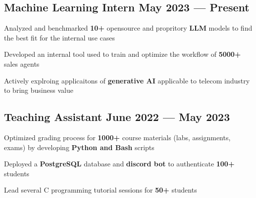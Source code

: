 
\subsection{{Machine Learning Intern \hfill May 2023 --- Present}}
\begin{zitemize}
    \item Analyzed and benchmarked \textbf{10+} opensource and propritory \textbf{LLM} models to find the best fit for the internal use cases
    \item Developed an internal tool used to train and optimize the workflow of \textbf{5000+} sales agents
    \item Actively explroing applicaitons of \textbf{generative AI} applicable to telecom industry to bring business value
\end{zitemize}


\vspace{0.3cm}\subsection{{Teaching Assistant \hfill June 2022 --- May 2023}}
\begin{zitemize}
    \item Optimized grading process for \textbf{1000+} course materials (labs, assignments, exams) by developing \textbf{Python and Bash} scripts
    \item Deployed a \textbf{PostgreSQL} database and \textbf{discord bot} to authenticate \textbf{100+} students
    \item Lead several C programming tutorial sessions for \textbf{50+} students
\end{zitemize}

